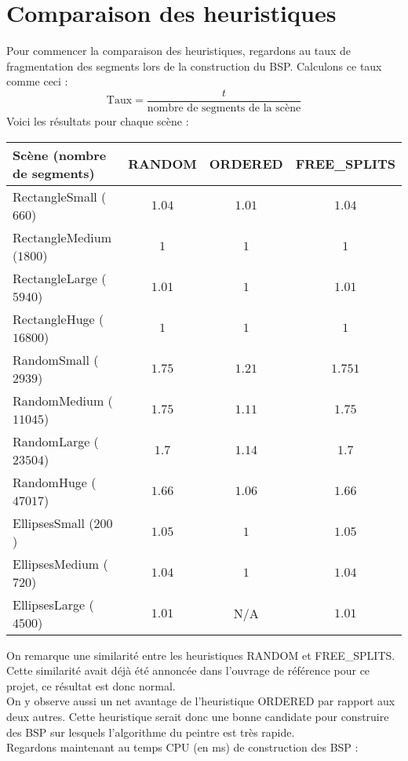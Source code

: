 \documentclass[11pts]{article}
\begin{document}
\newpage
\section{Comparaison des heuristiques}
Pour commencer la comparaison des heuristiques, regardons au taux de fragmentation des segments lors de la construction du BSP. Calculons ce taux comme ceci :\\
\[ \text{Taux} = \frac{t}{\text{nombre de segments de la scène}}\]
Voici les résultats pour chaque scène :
\begin{longtable}{|l|c|c|c|}
\hline
\textbf{Scène (nombre de segments)} & \textbf{RANDOM} & \textbf{ORDERED} & \textbf{FREE\_SPLITS}\\
\hline
RectangleSmall ($660$)&$1.04$&$1.01$&$1.04$\\
\hline
RectangleMedium ($1800$)&$1$&$1$&$1$\\
\hline
RectangleLarge ($5940$)&$1.01$&$1$&$1.01$\\
\hline
RectangleHuge ($16800$)&$1$&$1$&$1$\\
\hline
RandomSmall ($2939$)&$1.75$&$1.21$&$1.751$\\
\hline
RandomMedium ($11045$)&$1.75$&$1.11$&$1.75$\\
\hline
RandomLarge ($23504$)&$1.7$&$1.14$&$1.7$\\
\hline
RandomHuge ($47017$)&$1.66$&$1.06$&$1.66$\\
\hline
EllipsesSmall ($200$)&$1.05$&$1$&$1.05$\\
\hline
EllipsesMedium ($720$)&$1.04$&$1$&$1.04$\\
\hline
EllipsesLarge ($4500$)&$1.01$&N/A&$1.01$\\
\hline
\end{longtable}
\noindent On remarque une similarité entre les heuristiques RANDOM et FREE\_SPLITS. Cette similarité avait déjà été annoncée dans l'ouvrage de référence pour ce projet, ce résultat est donc normal.\\
On y observe aussi un net avantage de l'heuristique ORDERED par rapport aux deux autres. Cette heuristique serait donc une bonne candidate pour construire des BSP sur lesquels l'algorithme du peintre est très rapide.\\[0.5cm]
Regardons maintenant au temps CPU (en ms) de construction des BSP :
\end{document}
